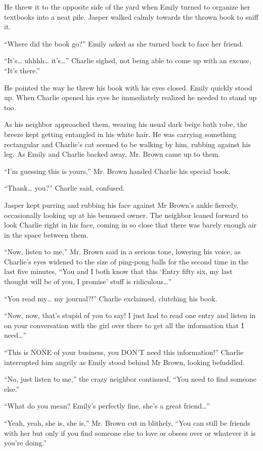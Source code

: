 He threw it to the opposite side of the yard when Emily turned to organize her textbooks into a neat pile. Jasper walked calmly towards the thrown book to sniff it.

“Where did the book go?” Emily asked as she turned back to face her friend.

“It's… uhhhh… it's…” Charlie sighed, not being able to come up with an excuse, “It's there.”

He pointed the way he threw his book with his eyes closed. Emily quickly stood up. When Charlie opened his eyes he immediately realized he needed to stand up too.

As his neighbor approached them, wearing his usual dark beige bath robe, the breeze kept getting entangled in his white hair. He was carrying something rectangular and Charlie's cat seemed to be walking by him, rubbing against his leg. As Emily and Charlie backed away, Mr. Brown came up to them.

“I'm guessing this is yours,” Mr. Brown handed Charlie his special book.

“Thank… you?” Charlie said, confused.

Jasper kept purring and rubbing his face against Mr Brown's ankle fiercely, occasionally looking up at his bemused owner. The neighbor leaned forward to look Charlie right in his face, coming in so close that there was barely enough air in the space between them.

“Now, listen to me,” Mr. Brown said in a serious tone, lowering his voice, as Charlie's eyes widened to the size of ping-pong balls for the second time in the last five minutes, “You and I both know that this ‘Entry fifty six, my last thought will be of you, I promise' stuff is ridiculous…”

“You read my… my journal?!” Charlie exclaimed, clutching his book.

“Now, now, that's stupid of you to say! I just had to read one entry and listen in on your conversation with the girl over there to get all the information that I need…”

“This is NONE of your business, you DON'T need this information!” Charlie interrupted him angrily as Emily stood behind Mr Brown, looking befuddled.

“No, just listen to me,” the crazy neighbor continued, “You need to find someone else.”

“What do you mean? Emily's perfectly fine, she's a great friend…”

“Yeah, yeah, she is, she is,” Mr. Brown cut in blithely, “You can still be friends with her but only if you find someone else to love or obsess over or whatever it is you're doing.”

